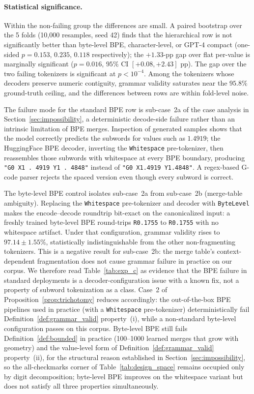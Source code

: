 \documentclass[sensors,article,submit,moreauthors,pdftex]{Definitions/mdpi}
\begin{document}
\paragraph{Statistical significance.} Within the non-failing group the differences are small. A paired bootstrap over the 5 folds (10{,}000 resamples, seed 42) finds that the hierarchical row is not significantly better than byte-level BPE, character-level, or GPT-4 compact (one-sided $p = 0.153$, $0.235$, $0.118$ respectively); the $+1.33$-pp gap over flat per-value is marginally significant ($p = 0.016$, $95\%$ CI $[+0.08, +2.43]$ pp). The gap over the two failing tokenizers is significant at $p < 10^{-4}$. Among the tokenizers whose decoders preserve numeric contiguity, grammar validity saturates near the $95.8\%$ ground-truth ceiling, and the differences between rows are within fold-level noise.

The failure mode for the standard BPE row is sub-case~2a of the case analysis in Section~\ref{sec:impossibility}, a deterministic decode-side failure rather than an intrinsic limitation of BPE merges. Inspection of generated samples shows that the model correctly predicts the subwords for values such as $1.4919$; the HuggingFace BPE decoder, inverting the \texttt{Whitespace} pre-tokenizer, then reassembles those subwords with whitespace at every BPE boundary, producing \texttt{"G0 X1 . 4919 Y1 . 4848"} instead of \texttt{"G0 X1.4919 Y1.4848"}. A regex-based G-code parser rejects the spaced version even though every subword is correct.

The byte-level BPE control isolates sub-case~2a from sub-case~2b (merge-table ambiguity). Replacing the \texttt{Whitespace} pre-tokenizer and decoder with \texttt{ByteLevel} makes the encode--decode roundtrip bit-exact on the canonicalized input: a freshly trained byte-level BPE round-trips \texttt{R0.1755} to \texttt{R0.1755} with no whitespace artifact. Under that configuration, grammar validity rises to $97.14 \pm 1.55\%$, statistically indistinguishable from the other non-fragmenting tokenizers. This is a negative result for sub-case~2b: the merge table's context-dependent fragmentation does not cause grammar failure in practice on our corpus. We therefore read Table~\ref{tab:exp_c} as evidence that the BPE failure in standard deployments is a decoder-configuration issue with a known fix, not a property of subword tokenization as a class. Case~2 of Proposition~\ref{prop:trichotomy} reduces accordingly: the out-of-the-box BPE pipelines used in practice (with a \texttt{Whitespace} pre-tokenizer) deterministically fail Definition~\ref{def:grammar_valid} property~(i), while a non-standard byte-level configuration passes on this corpus. Byte-level BPE still fails Definition~\ref{def:bounded} in practice (100--1000 learned merges that grow with geometry) and the value-level form of Definition~\ref{def:grammar_valid} property~(ii), for the structural reason established in Section~\ref{sec:impossibility}, so the all-checkmarks corner of Table~\ref{tab:design_space} remains occupied only by digit decomposition; byte-level BPE improves on the whitespace variant but does not satisfy all three properties simultaneously.
\end{document}
